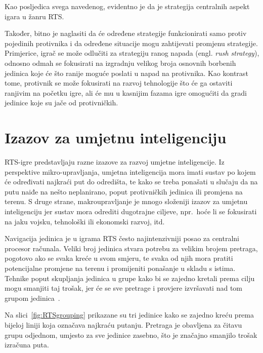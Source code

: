 \documentclass[times, utf8, zavrsni, numeric]{fer}
\begin{document}
\par Kao posljedica svega navedenog, evidentno je da je strategija centralnih aspekt igara u žanru RTS.

\par Također, bitno je naglasiti da će određene strategije funkcionirati samo protiv pojedinih protivnika i da određene situacije mogu zahtijevati promjenu strategije. 
Primjerice, igrač se može odlučiti za strategiju ranog napada (engl. \textit{rush strategy}), odnosno odmah se fokusirati na izgradnju velikog broja osnovnih borbenih jedinica koje će što ranije moguće poslati u napad na protivnika.
Kao kontrast tome, protivnik se može fokusirati na razvoj tehnologije što će ga ostaviti ranjivim na početku igre, ali će mu u kasnijim fazama igre omogućiti da gradi jedinice koje su jače od protivničkih.

\section{Izazov za umjetnu inteligenciju}

\par RTS-igre predstavljaju razne izazove za razvoj umjetne inteligencije. 
Iz perspektive mikro-upravljanja, umjetna inteligencija mora imati sustav po kojem će određivati najkraći put do odredišta, te kako se treba ponašati u slučaju da na putu naiđe na nešto neplanirano, poput protivničkih jedinica ili promjena na terenu. 
S druge strane, makroupravljanje je mnogo složeniji izazov za umjetnu inteligenciju jer sustav mora odrediti dugotrajne ciljeve, npr.\ hoće li se fokusirati na jaku vojsku, tehnološki ili ekonomski razvoj, itd.

\par Navigacija jedinica je u igrama RTS često najintenzivniji posao za centralni procesor računala.
Veliki broj jedinica stvara potrebu za velikim brojem pretraga, pogotovo ako se svaka kreće u svom smjeru, te svaka od njih mora pratiti potencijalne promjene na terenu i promijeniti ponašanje u skladu s istima.
Tehnike poput skupljanja jedinica u grupe kako bi se zajedno kretali prema cilju mogu smanjiti taj trošak, jer će se sve pretrage i provjere izvršavati nad tom grupom jedinica~\cite{book:AIGameProgrammingWisdom}. 

\par Na slici~\ref{fig:RTSgrouping} prikazane su tri jedinice kako se zajedno kreću prema bijeloj liniji koja označava najkraću putanju.
Pretraga je obavljena za čitavu grupu odjednom, umjesto za sve jedinice zasebno, što je značajno smanjilo trošak izračuna puta.
\end{document}
